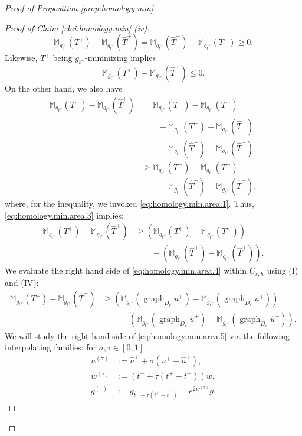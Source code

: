 \documentclass[11pt, letterpaper, reqno]{amsart}
\numberwithin{equation}{section}
\theoremstyle{remark}
\newcommand{\MM}{\mathbb{M}}
\newcommand{\graph}{\operatorname{graph}}
\begin{document}
\begin{proof}[Proof of Proposition \ref{prop:homology.min}]
\begin{proof}[Proof of Claim \ref{clai:homology.min} (iv)]
\begin{equation}
			\MM_{g_{t^-}}(T^+) - \MM_{g_{t^-}}(\hat T^+) = \MM_{g_{t^-}}(\hat T^-) - \MM_{g_{t^-}}(T^-) \geq 0.
		\end{equation}
		Likewise, $T^+$ being $g_{t^+}$-minimizing implies
		\begin{equation} \label{eq:homology.min.area.2}
			\MM_{g_{t^+}}(T^+) - \MM_{g_{t^+}}(\hat T^+) \leq 0.
		\end{equation}
		On the other hand, we also have
		\begin{align} \label{eq:homology.min.area.3}
			\MM_{g_{t^+}}(T^+) - \MM_{g_{t^+}}(\hat T^+)
				& = \MM_{g_{t^+}}(T^+) - \MM_{g_{t^-}}(T^+) \nonumber \\
				& \qquad + \MM_{g_{t^-}}(T^+) - \MM_{g_{t^-}}(\hat T^+) \nonumber \\
				& \qquad + \MM_{g_{t^-}}(\hat T^+) - \MM_{g_{t^+}}(\hat T^+) \nonumber \\
				& \geq \MM_{g_{t^+}}(T^+) - \MM_{g_{t^-}}(T^+) \nonumber \\
				& \qquad + \MM_{g_{t^-}}(\hat T^+) - \MM_{g_{t^+}}(\hat T^+),
		\end{align}
		where, for the inequality, we invoked \eqref{eq:homology.min.area.1}. Thus, \eqref{eq:homology.min.area.3} implies: 
		\begin{align} \label{eq:homology.min.area.4}
			\MM_{g_{t^+}}(T^+) - \MM_{g_{t^+}}(\hat T^+)
				& \geq (\MM_{g_{t^+}}(T^+) - \MM_{g_{t^-}}(T^+)) \nonumber \\
				& \qquad - (\MM_{g_{t^+}}(\hat T^+) - \MM_{g_{t^-}}(\hat T^+)).
		\end{align}
		We evaluate the right hand side of \eqref{eq:homology.min.area.4} within $C_{r,h}$ using (I) and (IV):
		\begin{align} \label{eq:homology.min.area.5}
			\MM_{g_{t^+}}(T^+) - \MM_{g_{t^+}}(\hat T^+)
				& \geq (\MM_{g_{t^+}}(\graph_{D_r} u^+) - \MM_{g_{t^-}}(\graph_{D_r} u^+)) \nonumber \\
				& \qquad - (\MM_{g_{t^+}}(\graph_{D_r} \hat u^+) - \MM_{g_{t^-}}(\graph_{D_r} \hat u^+)).
		\end{align}
		We will study the right hand side of \eqref{eq:homology.min.area.5} via the following interpolating families: for $\sigma, \tau \in [0,1]$
        \begin{align*}
           u^{(\sigma)} & := \hat u^+ + \sigma (u^+ - \hat u^+),  \\
           w^{(\tau)} & := (t^- + \tau(t^+-t^-)) w, \\
           g^{(\tau)} & := g_{t^- + \tau (t^+ - t^-)} = e^{2w^{(\tau)}} g.

\end{align*}
\end{proof}
\end{proof}
\end{document}
